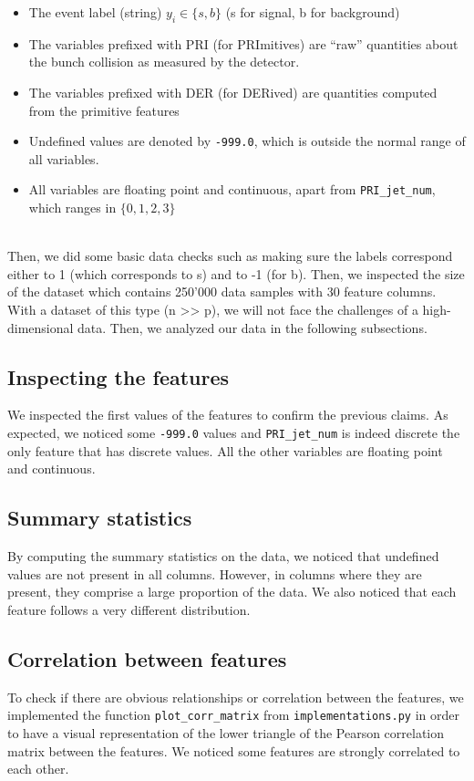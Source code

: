 \documentclass[10pt,conference,compsocconf]{IEEEtran}
\begin{document}
\begin{itemize}

\item The event label (string) $y_i \in \{s, b\}$ (s for signal, b for background)
\item The variables prefixed with PRI (for PRImitives) are “raw” quantities about the bunch collision as measured by the detector.
\item The variables prefixed with DER (for DERived) are quantities computed from the primitive features
\item Undefined values are denoted by \texttt{-999.0}, which is outside the normal range of all variables.
\item All variables are floating point and continuous, apart from 
\texttt{PRI\_jet\_num}, which ranges in $\{0, 1, 2, 3\}$

\end{itemize}
\ \\
Then, we did some basic data checks such as making sure the labels correspond either to 1 (which corresponds to s) and to -1 (for b). Then, we inspected the size of the dataset which contains 250'000 data samples with 30 feature columns. With a dataset of this type (n >> p), we will not face the challenges of a high-dimensional data. Then, we analyzed our data in the following subsections.
\ \\

\subsection{Inspecting the features} 
We inspected the first values of the features to confirm the previous claims. As expected, we noticed some \texttt{-999.0} values and \texttt{PRI\_jet\_num} is indeed discrete the only feature that has discrete values. All the other variables are floating point and continuous.
\subsection{Summary statistics} 
By computing the summary statistics on the data, we noticed that undefined values are not present in all columns. However, in columns where they are present, they comprise a large proportion of the data.
We also noticed that each feature follows a very different distribution.
\subsection{Correlation between features} 
To check if there are obvious relationships or correlation between the features, we implemented the function \texttt{plot\_corr\_matrix} from \texttt{implementations.py} in order to have a visual representation of the lower triangle of the Pearson correlation matrix between the features. We noticed some features are strongly correlated to each other.
\end{document}
